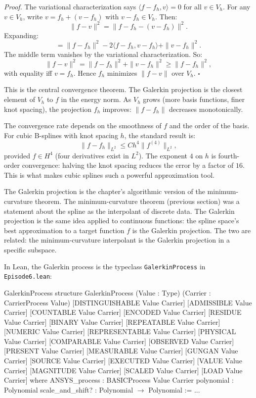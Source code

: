 \emph{Proof.} The variational characterization says $\langle f - f_h,
v \rangle = 0$ for all $v \in V_h$. For any $v \in V_h$, write
$v = f_h + (v - f_h)$ with $v - f_h \in V_h$. Then:
\[
\|f - v\|^2 = \|f - f_h - (v - f_h)\|^2.
\]
Expanding:
\[
= \|f - f_h\|^2 - 2 \langle f - f_h, v - f_h \rangle + \|v - f_h\|^2.
\]
The middle term vanishes by the variational characterization. So:
\[
\|f - v\|^2 = \|f - f_h\|^2 + \|v - f_h\|^2 \ge \|f - f_h\|^2,
\]
with equality iff $v = f_h$. Hence $f_h$ minimizes $\|f - v\|$ over
$V_h$. $\square$

This is the central convergence theorem. The Galerkin projection is
the closest element of $V_h$ to $f$ in the energy norm. As $V_h$
grows (more basis functions, finer knot spacing), the projection
$f_h$ improves: $\|f - f_h\|$ decreases monotonically.

The convergence rate depends on the smoothness of $f$ and the order
of the basis. For cubic B-splines with knot spacing $h$, the standard
result is:
\[
\|f - f_h\|_{L^2} \le C h^4 \|f^{(4)}\|_{L^2},
\]
provided $f \in H^4$ (four derivatives exist in $L^2$). The
exponent $4$ on $h$ is fourth-order convergence: halving the knot
spacing reduces the error by a factor of $16$. This is what makes
cubic splines such a powerful approximation tool.

The Galerkin projection is the chapter's algorithmic version of the
minimum-curvature theorem. The minimum-curvature theorem (previous
section) was a statement about the spline as the interpolant of
discrete data. The Galerkin projection is the same idea applied to
continuous functions: the spline space's best approximation to a
target function $f$ is the Galerkin projection. The two are
related: the minimum-curvature interpolant is the Galerkin
projection in a specific subspace.

In Lean, the Galerkin process is the typeclass
\texttt{GalerkinProcess} in \texttt{Episode6.lean}:

\begin{leanexcerpt}{GalerkinProcess}
structure GalerkinProcess
    (Value : Type)
    (Carrier : CarrierProcess Value)
    [DISTINGUISHABLE Value Carrier] [ADMISSIBLE Value Carrier]
    [COUNTABLE Value Carrier]       [ENCODED Value Carrier]
    [RESIDUE Value Carrier]         [BINARY Value Carrier]
    [REPEATABLE Value Carrier]      [NUMERIC Value Carrier]
    [REPRESENTABLE Value Carrier]   [PHYSICAL Value Carrier]
    [COMPARABLE Value Carrier]      [OBSERVED Value Carrier]
    [PRESENT Value Carrier]         [MEASURABLE Value Carrier]
    [GUNGAN Value Carrier]          [SOURCE Value Carrier]
    [EXECUTED Value Carrier]        [VALUE Value Carrier]
    [MAGNITUDE Value Carrier]       [SCALED Value Carrier]
    [LOAD Value Carrier]
  where
  ANSYS_process     : BASICProcess Value Carrier
  polynomial        : Polynomial
  scale_and_shift?  : Polynomial $\to$ Polynomial := ...
\end{leanexcerpt}

